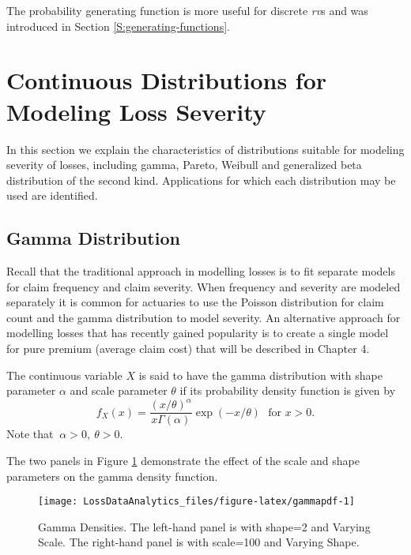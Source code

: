 \documentclass[]{book}
\theoremstyle{definition}
\theoremstyle{definition}
\theoremstyle{definition}
\theoremstyle{remark}
\begin{document}
The probability generating function is more useful for discrete
\emph{rv}s and was introduced in Section \ref{S:generating-functions}.

\section{Continuous Distributions for Modeling Loss
Severity}\label{S:ContinuousDistn}

In this section we explain the characteristics of distributions suitable
for modeling severity of losses, including gamma, Pareto, Weibull and
generalized beta distribution of the second kind. Applications for which
each distribution may be used are identified.

\subsection{Gamma Distribution}\label{gamma-distribution}

Recall that the traditional approach in modelling losses is to fit
separate models for claim frequency and claim severity. When frequency
and severity are modeled separately it is common for actuaries to use
the Poisson distribution for claim count and the gamma distribution to
model severity. An alternative approach for modelling losses that has
recently gained popularity is to create a single model for pure premium
(average claim cost) that will be described in Chapter 4.

The continuous variable \(X\) is said to have the gamma distribution
with shape parameter \(\alpha\) and scale parameter \(\theta\) if its
probability density function is given by
\[f_{X}\left( x \right) = \frac{\left( x/ \theta  \right)^{\alpha}}{x\Gamma\left( \alpha \right)}\exp \left( -x/ \theta \right) \ \ \ \text{for } x > 0 .\]
Note that \(\ \alpha > 0,\ \theta > 0\).

The two panels in Figure \ref{fig:gammapdf} demonstrate the effect of
the scale and shape parameters on the gamma density function.

\begin{figure}

{\centering \texttt{[image: LossDataAnalytics\_files/figure-latex/gammapdf-1]} 

}

\caption{Gamma Densities. The left-hand panel is with shape=2 and Varying Scale. 
 The right-hand panel is with scale=100 and Varying Shape.}\label{fig:gammapdf}
\end{figure}
\end{document}
